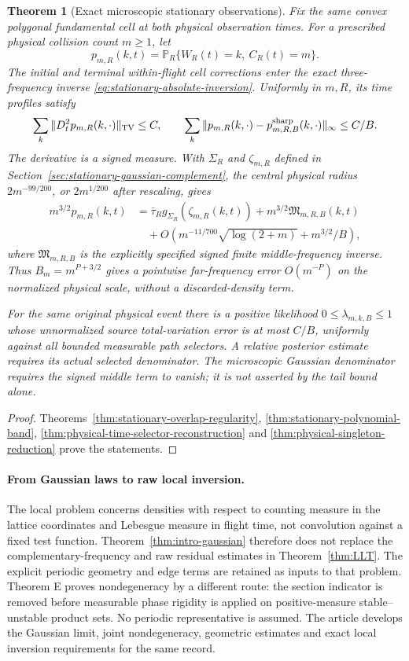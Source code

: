 \documentclass[11pt,reqno]{amsart}
\numberwithin{equation}{section}
\newtheorem{maintheorem}{Theorem}
\theoremstyle{definition}\newtheorem{definition}[theorem]{Definition}
\theoremstyle{remark}\newtheorem{remark}[theorem]{Remark}
\begin{document}
\begin{maintheorem}[Exact microscopic stationary observations]
\label{thm:intro-exact-physical-endpoint}
Fix the same convex polygonal fundamental cell at both physical
observation times. For a prescribed physical collision count $m\ge1$,
let
\[
 p_{m,R}(k,t)=\mathbb P_R\{W_R(t)=k,\ C_R(t)=m\}.
\]
The initial and terminal within-flight cell corrections enter the exact
three-frequency inverse \eqref{eq:stationary-absolute-inversion}.
Uniformly in $m,R$, its time profiles satisfy
\[
 \sum_k\|D_t^2p_{m,R}(k,\cdot)\|_{\operatorname{TV}}\le C,
 \qquad
 \sum_k\|p_{m,R}(k,\cdot)-p^{\rm sharp}_{m,R,B}(k,\cdot)\|_\infty
                                                      \le C/B.
\]
The derivative is a signed measure. With $\Sigma_R$ and
$\zeta_{m,R}$ defined in
Section~\ref{sec:stationary-gaussian-complement}, the central physical
radius $2m^{-99/200}$, or $2m^{1/200}$ after rescaling, gives
\begin{align*}
 m^{3/2}p_{m,R}(k,t)
 &=\bar\tau_Rg_{\Sigma_R}(\zeta_{m,R}(k,t))
       +m^{3/2}\mathfrak M_{m,R,B}(k,t)\\
 &\quad+O\left(m^{-11/700}\sqrt{\log(2+m)}+m^{3/2}/B\right),
\end{align*}
where $\mathfrak M_{m,R,B}$ is the explicitly specified signed finite
middle-frequency inverse. Thus $B_m=m^{P+3/2}$ gives a pointwise
far-frequency error $O(m^{-P})$ on the normalized physical scale,
without a discarded-density term.

For the same original physical event there is a positive likelihood
$0\le\lambda_{m,k,B}\le1$ whose unnormalized source total-variation
error is at most $C/B$, uniformly against all bounded measurable path
selectors. A relative posterior estimate requires its actual selected
denominator. The microscopic Gaussian denominator requires the signed
middle term to vanish; it is not asserted by the tail bound alone.
\end{maintheorem}
\begin{proof}
Theorems~\ref{thm:stationary-overlap-regularity},
\ref{thm:stationary-polynomial-band},
\ref{thm:physical-time-selector-reconstruction} and
\ref{thm:physical-singleton-reduction} prove the statements.
\end{proof}

\paragraph{From Gaussian laws to raw local inversion.}
The local problem concerns densities with respect to counting measure
in the lattice coordinates and Lebesgue measure in flight time, not
convolution against a fixed test function. Theorem~\ref{thm:intro-gaussian}
therefore does not replace the complementary-frequency and raw residual
estimates in Theorem~\ref{thm:LLT}. The explicit periodic geometry
and edge terms are retained as inputs to that problem. Theorem E proves
nondegeneracy by a different route: the section indicator is removed
before measurable phase rigidity is applied on positive-measure
stable--unstable product sets. No periodic representative is assumed.
The article develops the Gaussian limit, joint nondegeneracy, geometric
estimates and exact local inversion requirements for the same record.
\end{document}
